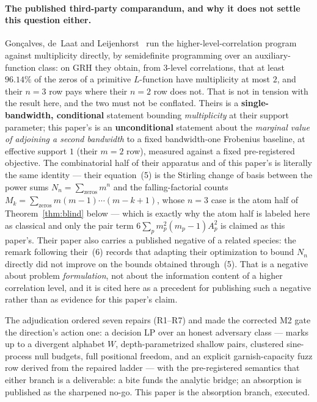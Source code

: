 \documentclass[11pt]{article}
\theoremstyle{plain}
\theoremstyle{definition}
\theoremstyle{remark}
\begin{document}
\paragraph{The published third-party comparandum, and why it does not settle this
question either.}
Gon\c{c}alves, de~Laat and Leijenhorst~\cite{GdLL25} run the
higher-level-correlation program against multiplicity directly, by semidefinite
programming over an auxiliary-function class: on GRH they obtain, from $3$-level
correlations, that at least $96.14\%$ of the zeros of a primitive $L$-function have
multiplicity at most $2$, and their $n = 3$ row pays where their $n = 2$ row does
not. That is not in tension with the result here, and the two must not be conflated.
Theirs is a \textbf{single-bandwidth, conditional} statement bounding
\emph{multiplicity} at their support parameter; this paper's is an
\textbf{unconditional} statement about the \emph{marginal value of adjoining a
second bandwidth} to a fixed bandwidth-one Frobenius baseline, at effective support
$1$ (their $m = 2$ row), measured against a fixed pre-registered objective. The
combinatorial half of their apparatus and of this paper's is literally the same
identity --- their equation~(5) is the Stirling change of basis between the power
sums $N_n = \sum_{\text{zeros}} m^n$ and the falling-factorial counts
$M_k = \sum_{\text{zeros}} m(m-1)\cdots(m-k+1)$, whose $n = 3$ case is the atom half
of Theorem~\ref{thm:blind} below --- which is exactly why the atom half is labeled
here as classical and only the pair term $6\sum_p m_p^2 (m_p - 1) A_p^2$ is claimed
as this paper's. Their paper also carries a published negative of a related species:
the remark following their~(6) records that adapting their optimization to bound
$N_n$ directly did not improve on the bounds obtained through~(5). That is a negative
about problem \emph{formulation}, not about the information content of a higher
correlation level, and it is cited here as a precedent for publishing such a negative
rather than as evidence for this paper's claim.

The adjudication ordered seven repairs (R1--R7) and
made the corrected M2 gate the direction's action one: a decision LP over an
honest adversary class --- marks up to a divergent alphabet $W$,
depth-parametrized shallow pairs, clustered sine-process null budgets, full
positional freedom, and an explicit garnish-capacity fuzz row derived from the
repaired ladder --- with the pre-registered semantics that either branch is a
deliverable: a bite funds the analytic bridge; an absorption is published as the
sharpened no-go. This paper is the absorption branch, executed.
\end{document}
